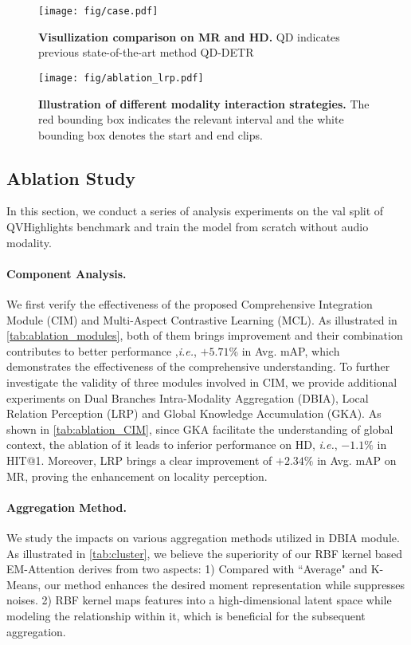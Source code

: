 \documentclass[10pt,twocolumn,letterpaper]{article}
\begin{document}
\begin{figure*}[h]
\vspace{3mm}
    \centering
    \texttt{[image: fig/case.pdf]}
    \caption{\textbf{Visullization comparison on MR and HD.} QD indicates previous state-of-the-art method QD-DETR~\cite{qddetr}}
    \label{fig:case_show}
    \vspace{-10pt}
\end{figure*}
\begin{figure}
    \centering
    \texttt{[image: fig/ablation\_lrp.pdf]}
    \caption{\textbf{Illustration of different modality interaction strategies.}
    The red bounding box indicates the relevant interval and the white bounding box denotes the start and end clips.}
    \label{fig:ablation-lrp}
    \vspace{-15pt}
\end{figure}


\subsection{Ablation Study}
In this section, we conduct a series of analysis experiments on the val split of QVHighlights benchmark and train the model from scratch without audio modality.

\paragraph{Component Analysis.}
We first verify the effectiveness of the proposed Comprehensive Integration Module (CIM) and Multi-Aspect Contrastive Learning (MCL).
As illustrated in \cref{tab:ablation_modules}, both of them brings improvement and their combination contributes to better performance ,\textit{i.e.}, $+5.71$\% in Avg. mAP, which demonstrates the effectiveness of the comprehensive understanding.
To further investigate the validity of three modules involved in CIM, we provide additional experiments on Dual Branches Intra-Modality Aggregation (DBIA), Local Relation Perception (LRP) and Global Knowledge Accumulation (GKA).  
As shown in \cref{tab:ablation_CIM}, since GKA facilitate the understanding of global context, the ablation of it leads to inferior performance on HD, \textit{i.e.}, $-1.1\%$ in HIT@1. Moreover, LRP brings a clear improvement of $+2.34\%$ in Avg. mAP on MR, proving the enhancement on locality perception.  

\vspace{-12pt}
\paragraph{Aggregation Method.}
We study the impacts on various aggregation methods utilized in DBIA module.
As illustrated in \cref{tab:cluster}, we believe the superiority of our RBF kernel based EM-Attention derives from two aspects: 1) Compared with ``Average" and K-Means, our method
enhances the desired moment representation while suppresses noises.
2) RBF kernel maps features into a high-dimensional latent space while modeling the relationship within it, which is beneficial for the subsequent aggregation.
\end{document}
